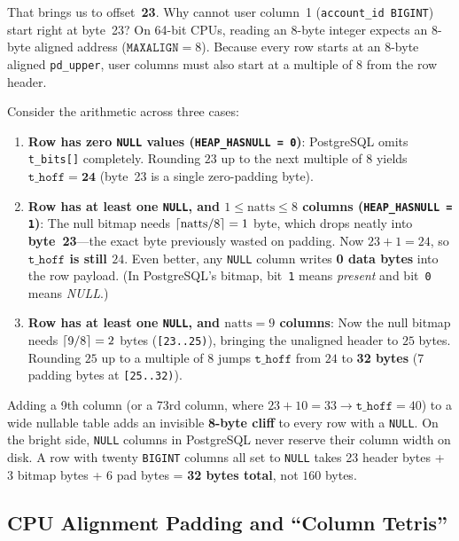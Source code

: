 That brings us to offset~\textbf{23}. Why cannot user column~1 (\texttt{account\_id BIGINT}) start right at byte~23? On 64-bit CPUs, reading an 8-byte integer expects an 8-byte aligned address ($\texttt{MAXALIGN} = 8$). Because every row starts at an 8-byte aligned \texttt{pd\_upper}, user columns must also start at a multiple of 8 from the row header.

Consider the arithmetic across three cases:
\begin{enumerate}
  \item \textbf{Row has zero \texttt{NULL} values (\texttt{HEAP\_HASNULL = 0})}: PostgreSQL omits \texttt{t\_bits[]} completely. Rounding $23$ up to the next multiple of $8$ yields $\texttt{t\_hoff} = \mathbf{24}$ (byte~23 is a single zero-padding byte).
  \item \textbf{Row has at least one \texttt{NULL}, and $1 \le \text{natts} \le 8$ columns (\texttt{HEAP\_HASNULL = 1})}: The null bitmap needs $\lceil\text{natts}/8\rceil = 1$ byte, which drops neatly into \textbf{byte~23}---the exact byte previously wasted on padding. Now $23 + 1 = 24$, so \textbf{$\texttt{t\_hoff}$ is still $24$}. Even better, any \texttt{NULL} column writes \textbf{0 data bytes} into the row payload. (In PostgreSQL's bitmap, bit~\texttt{1} means \emph{present} and bit~\texttt{0} means \emph{NULL}.)
  \item \textbf{Row has at least one \texttt{NULL}, and $\text{natts} = 9$ columns}: Now the null bitmap needs $\lceil9 / 8\rceil = 2$ bytes (\texttt{[23..25)}), bringing the unaligned header to $25$ bytes. Rounding $25$ up to a multiple of $8$ jumps $\texttt{t\_hoff}$ from $24$ to \textbf{32 bytes} (7 padding bytes at \texttt{[25..32)}).
\end{enumerate}

\begin{trapbox}
Adding a 9th column (or a 73rd column, where $23 + 10 = 33 \to \texttt{t\_hoff} = 40$) to a wide nullable table adds an invisible \textbf{8-byte cliff} to every row with a \texttt{NULL}. On the bright side, \texttt{NULL} columns in PostgreSQL never reserve their column width on disk. A row with twenty \texttt{BIGINT} columns all set to \texttt{NULL} takes 23 header bytes + 3 bitmap bytes + 6 pad bytes = \textbf{32 bytes total}, not $160$ bytes.
\end{trapbox}

\subsection{CPU Alignment Padding and ``Column Tetris''}

